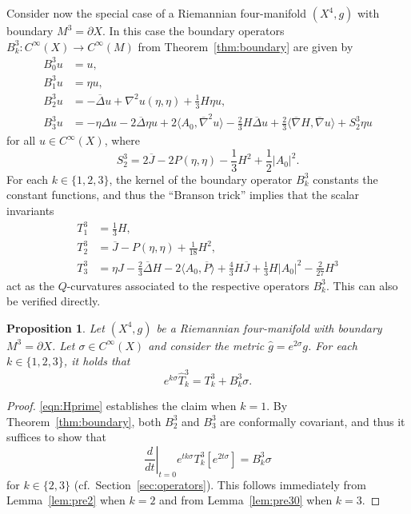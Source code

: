 \documentclass{amsart}
\newtheorem{prop}[thm]{Proposition}
\theoremstyle{definition}
\theoremstyle{remark}
\numberwithin{equation}{section}
\begin{document}
Consider now the special case of a Riemannian four-manifold $(X^4,g)$ with boundary $M^3=\partial X$.  In this case the boundary operators $B_k^3\colon C^\infty(X)\to C^\infty(M)$ from Theorem~\ref{thm:boundary} are given by
\begin{align*}
 B_0^3u & = u, \\
 B_1^3u & = \eta u, \\
 B_2^3u & = -{\overline{\Delta}} u + \nabla^2u(\eta,\eta) + \frac{1}{3}H\eta u, \\
 B_3^3u & = -\eta\Delta u - 2{\overline{\Delta}}\eta u + 2{\langle} A_0,{\overline{\nabla}}^2u{\rangle} - \frac{2}{3}H{\overline{\Delta}} u + \frac{2}{3}{\langle}{\overline{\nabla}} H, {\overline{\nabla}} u {\rangle} + S_2^3\eta u
\end{align*}
for all $u\in C^\infty(X)$, where
\[ S_2^3 = 2{\overline{J}} - 2P(\eta,\eta) - \frac{1}{3}H^2 + \frac{1}{2}{\lvert} A_0{\rvert}^2 . \]
For each $k\in\{1,2,3\}$, the kernel of the boundary operator $B_k^3$ constants the constant functions, and thus the ``Branson trick'' \cite{Branson1995} implies that the scalar invariants
\begin{align*}
 T_1^3 & = \frac{1}{3}H, \\
 T_2^3 & = {\overline{J}} - P(\eta,\eta) + \frac{1}{18}H^2 , \\
 T_3^3 & = \eta J - \frac{2}{3}{\overline{\Delta}} H - 2{\langle} A_0,{\overline{P}}{\rangle} + \frac{4}{3}H{\overline{J}} + \frac{1}{3}H{\lvert} A_0{\rvert}^2 - \frac{2}{27}H^3
\end{align*}
act as the $Q$-curvatures associated to the respective operators $B_k^3$.  This can also be verified directly.

\begin{prop}
 \label{prop:l4_conf_crit}
 Let $(X^4,g)$ be a Riemannian four-manifold with boundary $M^3=\partial X$.  Let $\sigma\in C^\infty(X)$ and consider the metric ${\widehat{g}}=e^{2\sigma}g$.  For each $k\in\{1,2,3\}$, it holds that
 \[ e^{k\sigma}{\widehat{T}}_k^3 = T_k^3 + B_k^3\sigma . \]
\end{prop}

\begin{proof}
 \eqref{eqn:Hprime} establishes the claim when $k=1$.  By Theorem~\ref{thm:boundary}, both $B_2^3$ and $B_3^3$ are conformally covariant, and thus it suffices to show that
 \[ \left.\frac{d}{dt}\right|_{t=0}e^{tk\sigma}T_k^3[e^{2t\sigma}] = B_k^3\sigma \]
 for $k\in\{2,3\}$ (cf.\ Section~\ref{sec:operators}).  This follows immediately from Lemma~\ref{lem:pre2} when $k=2$ and from Lemma~\ref{lem:pre30} when $k=3$.
\end{proof}
\end{document}

